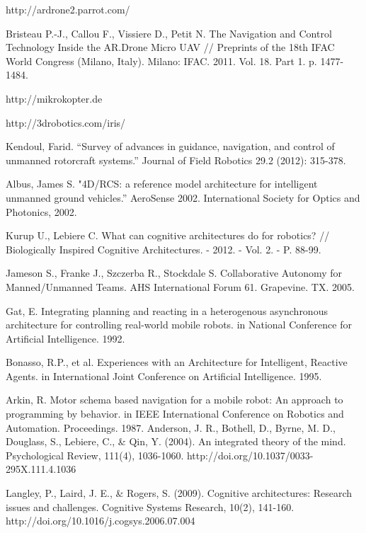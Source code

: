 \documentclass[review]{elsarticle}
\begin{document}
\begin{thebibliography}{9}
	 http://ardrone2.parrot.com/
		
	 Bristeau P.-J., Callou F., Vissiere D., Petit N. The Navigation and Control Technology Inside the AR.Drone Micro UAV // Preprints of the 18th IFAC World Congress (Milano, Italy). Milano: IFAC. 2011. Vol. 18. Part 1. p. 1477-1484.
	
	 http://mikrokopter.de
	
	 http://3drobotics.com/iris/
	
	 Kendoul, Farid. ``Survey of advances in guidance, navigation, and control of unmanned rotorcraft systems.'' Journal of Field Robotics 29.2 (2012): 315-378.
	
	 Albus, James S. "4D/RCS: a reference model architecture for intelligent unmanned ground vehicles.'' AeroSense 2002. International Society for Optics and Photonics, 2002.
	
	 Kurup U., Lebiere C. What can cognitive architectures do for robotics? // Biologically Inspired Cognitive Architectures. - 2012. - Vol. 2. - P. 88-99.
	
	 Jameson S., Franke J., Szczerba R., Stockdale S. Collaborative Autonomy for Manned/Unmanned Teams. AHS International Forum 61. Grapevine. TX. 2005.
	
	 Gat, E. Integrating planning and reacting in a heterogenous asynchronous architecture for controlling real-world mobile robots. in National Conference for Artificial Intelligence. 1992.
	
	 Bonasso, R.P., et al. Experiences with an Architecture for Intelligent, Reactive Agents. in International Joint Conference on Artificial Intelligence. 1995.
	
	 Arkin, R. Motor schema based navigation for a mobile robot: An approach to programming by behavior. in IEEE International Conference on Robotics and Automation. Proceedings. 1987.
	 Anderson, J. R., Bothell, D., Byrne, M. D., Douglass, S., Lebiere, C., \& Qin, Y. (2004). An integrated theory of the mind. Psychological Review, 111(4), 1036-1060. http://doi.org/10.1037/0033-295X.111.4.1036
	
	 Langley, P., Laird, J. E., \& Rogers, S. (2009). Cognitive architectures: Research issues and challenges. Cognitive Systems Research, 10(2), 141-160. http://doi.org/10.1016/j.cogsys.2006.07.004
	

\end{thebibliography}
\end{document}
